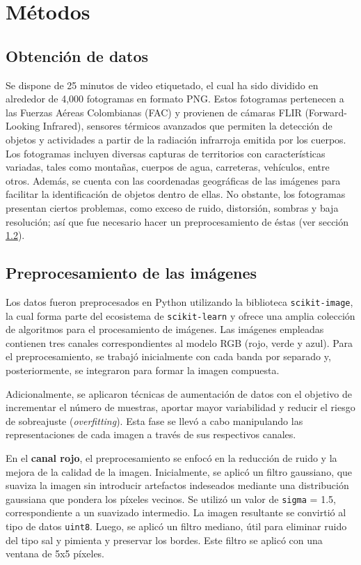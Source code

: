 \section{Métodos}
\subsection{Obtención de datos}
Se dispone de 25 minutos de video etiquetado, el cual ha sido dividido en alrededor de 4,000 fotogramas en formato PNG. Estos fotogramas pertenecen a las Fuerzas Aéreas Colombianas (FAC) y provienen de cámaras FLIR (Forward-Looking Infrared), sensores térmicos avanzados que permiten la detección de objetos y actividades a partir de la radiación infrarroja emitida por los cuerpos. Los fotogramas incluyen diversas capturas de territorios con características variadas, tales como montañas, cuerpos de agua, carreteras, vehículos, entre otros. Además, se cuenta con las coordenadas geográficas de las imágenes para facilitar la identificación de objetos dentro de ellas. No obstante, los fotogramas presentan ciertos problemas, como exceso de ruido, distorsión, sombras y baja resolución; así que fue necesario hacer un preprocesamiento de éstas (ver sección \ref{prepro_datos}). 

\subsection{Preprocesamiento de las imágenes} \label{prepro_datos}

Los datos fueron preprocesados en Python utilizando la biblioteca \texttt{scikit-image}, la cual forma parte del ecosistema de \texttt{scikit-learn} y ofrece una amplia colección de algoritmos para el procesamiento de imágenes. Las imágenes empleadas contienen tres canales correspondientes al modelo RGB (rojo, verde y azul). Para el preprocesamiento, se trabajó inicialmente con cada banda por separado y, posteriormente, se integraron para formar la imagen compuesta. 

Adicionalmente, se aplicaron técnicas de aumentación de datos con el objetivo de incrementar el número de muestras, aportar mayor variabilidad y reducir el riesgo de sobreajuste (\textit{overfitting}). Esta fase se llevó a cabo manipulando las representaciones de cada imagen a través de sus respectivos canales.

En el \textbf{canal rojo}, el preprocesamiento se enfocó en la reducción de ruido y la mejora de la calidad de la imagen. Inicialmente, se aplicó un filtro gaussiano, que suaviza la imagen sin introducir artefactos indeseados mediante una distribución gaussiana que pondera los píxeles vecinos. Se utilizó un valor de \texttt{sigma} = 1.5, correspondiente a un suavizado intermedio. La imagen resultante se convirtió al tipo de datos \texttt{uint8}. Luego, se aplicó un filtro mediano, útil para eliminar ruido del tipo sal y pimienta y preservar los bordes. Este filtro se aplicó con una ventana de 5x5 píxeles.

